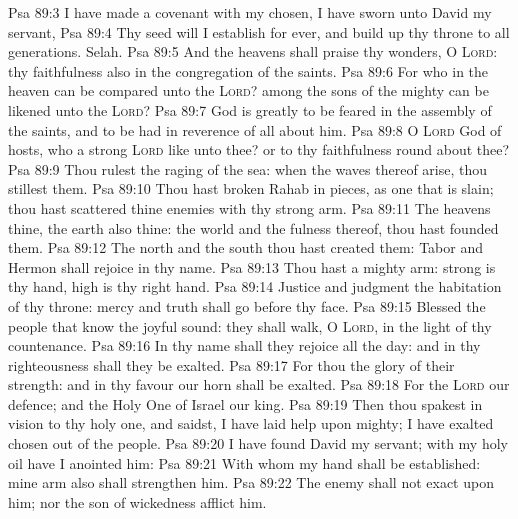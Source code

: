\vs Psa 89:3 I have made a covenant with my chosen, I have sworn unto David my servant,
\vs Psa 89:4 Thy seed will I establish for ever, and build up thy throne to all generations. Selah.
\vs Psa 89:5 And the heavens shall praise thy wonders, O \textsc{Lord}: thy faithfulness also in the congregation of the saints.
\vs Psa 89:6 For who in the heaven can be compared unto the \textsc{Lord}?  among the sons of the mighty can be likened unto the \textsc{Lord}?
\vs Psa 89:7 God is greatly to be feared in the assembly of the saints, and to be had in reverence of all  about him.
\vs Psa 89:8 O \textsc{Lord} God of hosts, who  a strong \textsc{Lord} like unto thee? or to thy faithfulness round about thee?
\vs Psa 89:9 Thou rulest the raging of the sea: when the waves thereof arise, thou stillest them.
\vs Psa 89:10 Thou hast broken Rahab in pieces, as one that is slain; thou hast scattered thine enemies with thy strong arm.
\vs Psa 89:11 The heavens  thine, the earth also  thine:  the world and the fulness thereof, thou hast founded them.
\vs Psa 89:12 The north and the south thou hast created them: Tabor and Hermon shall rejoice in thy name.
\vs Psa 89:13 Thou hast a mighty arm: strong is thy hand,  high is thy right hand.
\vs Psa 89:14 Justice and judgment  the habitation of thy throne: mercy and truth shall go before thy face.
\vs Psa 89:15 Blessed  the people that know the joyful sound: they shall walk, O \textsc{Lord}, in the light of thy countenance.
\vs Psa 89:16 In thy name shall they rejoice all the day: and in thy righteousness shall they be exalted.
\vs Psa 89:17 For thou  the glory of their strength: and in thy favour our horn shall be exalted.
\vs Psa 89:18 For the \textsc{Lord}  our defence; and the Holy One of Israel  our king.
\vs Psa 89:19 Then thou spakest in vision to thy holy one, and saidst, I have laid help upon  mighty; I have exalted  chosen out of the people.
\vs Psa 89:20 I have found David my servant; with my holy oil have I anointed him:
\vs Psa 89:21 With whom my hand shall be established: mine arm also shall strengthen him.
\vs Psa 89:22 The enemy shall not exact upon him; nor the son of wickedness afflict him.
